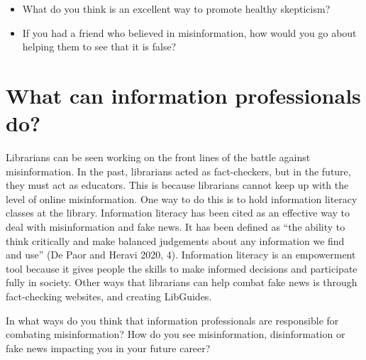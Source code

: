 \documentclass[
  letterpaper,
  DIV=11,
  numbers=noendperiod]{scrreprt}
\begin{document}
\begin{tcolorbox}[enhanced jigsaw, arc=.35mm, bottomrule=.15mm, bottomtitle=1mm, breakable, colback=white, colbacktitle=quarto-callout-tip-color!10!white, colframe=quarto-callout-tip-color-frame, coltitle=black, left=2mm, leftrule=.75mm, opacityback=0, opacitybacktitle=0.6, rightrule=.15mm, title=\textcolor{quarto-callout-tip-color}{\faLightbulb}\hspace{0.5em}{Pause and Reflect}, titlerule=0mm, toprule=.15mm, toptitle=1mm]

\begin{itemize}
\item
  What do you think is an excellent way to promote healthy skepticism?
\item
  If you had a friend who believed in misinformation, how would you go
  about helping them to see that it is false?
\end{itemize}

\end{tcolorbox}

\section{What can information professionals
do?}\label{what-can-information-professionals-do}

Librarians can be seen working on the front lines of the battle against
misinformation. In the past, librarians acted as fact-checkers, but in
the future, they must act as educators. This is because librarians
cannot keep up with the level of online misinformation. One way to do
this is to hold information literacy classes at the library. Information
literacy has been cited as an effective way to deal with misinformation
and fake news. It has been defined as ``the ability to think critically
and make balanced judgements about any information we find and use'' (De
Paor and Heravi 2020, 4). Information literacy is an empowerment tool
because it gives people the skills to make informed decisions and
participate fully in society. Other ways that librarians can help combat
fake news is through fact-checking websites, and creating LibGuides.

\begin{tcolorbox}[enhanced jigsaw, arc=.35mm, bottomrule=.15mm, bottomtitle=1mm, breakable, colback=white, colbacktitle=quarto-callout-tip-color!10!white, colframe=quarto-callout-tip-color-frame, coltitle=black, left=2mm, leftrule=.75mm, opacityback=0, opacitybacktitle=0.6, rightrule=.15mm, title=\textcolor{quarto-callout-tip-color}{\faLightbulb}\hspace{0.5em}{Pause and Reflect}, titlerule=0mm, toprule=.15mm, toptitle=1mm]

In what ways do you think that information professionals are responsible
for combating misinformation? How do you see misinformation,
disinformation or fake news impacting you in your future career?

\end{tcolorbox}
\end{document}
